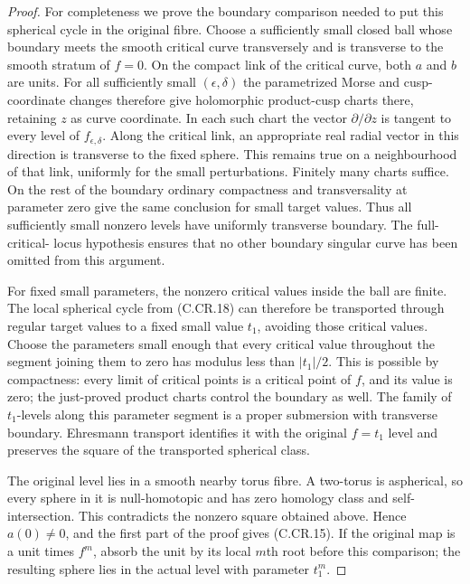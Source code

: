\begin{proof}
For completeness we prove the boundary comparison
needed to put this spherical cycle in the original fibre.
Choose a sufficiently small closed ball whose
boundary meets the smooth critical curve transversely
and is transverse to the smooth stratum of $f=0$.
On the compact link of the critical curve, both
$a$ and $b$ are units. For all sufficiently small
$(\epsilon,\delta)$ the parametrized Morse and
cusp-coordinate changes therefore give holomorphic
product-cusp charts there, retaining $z$ as curve
coordinate. In each such chart the vector
$\partial/\partial z$ is tangent to every level
of $f_{\epsilon,\delta}$. Along the critical link,
an appropriate real radial vector in this direction
is transverse to the fixed sphere. This remains
true on a neighbourhood of that link, uniformly
for the small perturbations. Finitely many charts
suffice. On the rest of the boundary ordinary
compactness and transversality at parameter zero
give the same conclusion for small target values.
Thus all sufficiently small nonzero levels have
uniformly transverse boundary. The full-critical-
locus hypothesis ensures that no other boundary
singular curve has been omitted from this argument.

For fixed small parameters, the nonzero critical
values inside the ball are finite. The local
spherical cycle from (C.CR.18) can therefore be transported
through regular target values to a fixed small
value $t_1$, avoiding those critical values.
Choose the parameters small enough that every
critical value throughout the segment joining
them to zero has modulus less than $|t_1|/2$.
This is possible by compactness: every limit of
critical points is a critical point of $f$, and
its value is zero; the just-proved product charts
control the boundary as well. The family of
$t_1$-levels along this parameter segment is a
proper submersion with transverse boundary.
Ehresmann transport identifies it with the
original $f=t_1$ level and preserves the square
of the transported spherical class.

The original level lies in a smooth nearby torus
fibre. A two-torus is aspherical, so every sphere
in it is null-homotopic and has zero homology
class and self-intersection. This contradicts
the nonzero square obtained above. Hence $a(0)\ne0$,
and the first part of the proof gives (C.CR.15).
If the original map is a unit times $f^m$, absorb
the unit by its local $m$th root before this
comparison; the resulting sphere lies in the
actual level with parameter $t_1^m$.
\end{proof}

